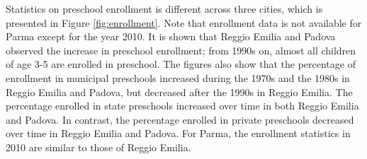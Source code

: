 Statistics on preschool enrollment is different across three cities, which is presented in Figure \ref{fig:enrollment}. Note that enrollment data is not available for Parma except for the year 2010. It is shown that Reggio Emilia and Padova observed the increase in preschool enrollment; from 1990s on, almost all children of age 3-5 are enrolled in preschool. The figures also show that the percentage of enrollment in municipal preschools increased during the 1970s and the 1980s in Reggio Emilia and Padova, but decreased after the 1990s in Reggio Emilia. The percentage enrolled in state preschools increased over time in both Reggio Emilia and Padova. In contrast, the percentage enrolled in private preschools decreased over time in Reggio Emilia and Padova. For Parma, the enrollment statistics in 2010 are similar to those of Reggio Emilia. 
 
